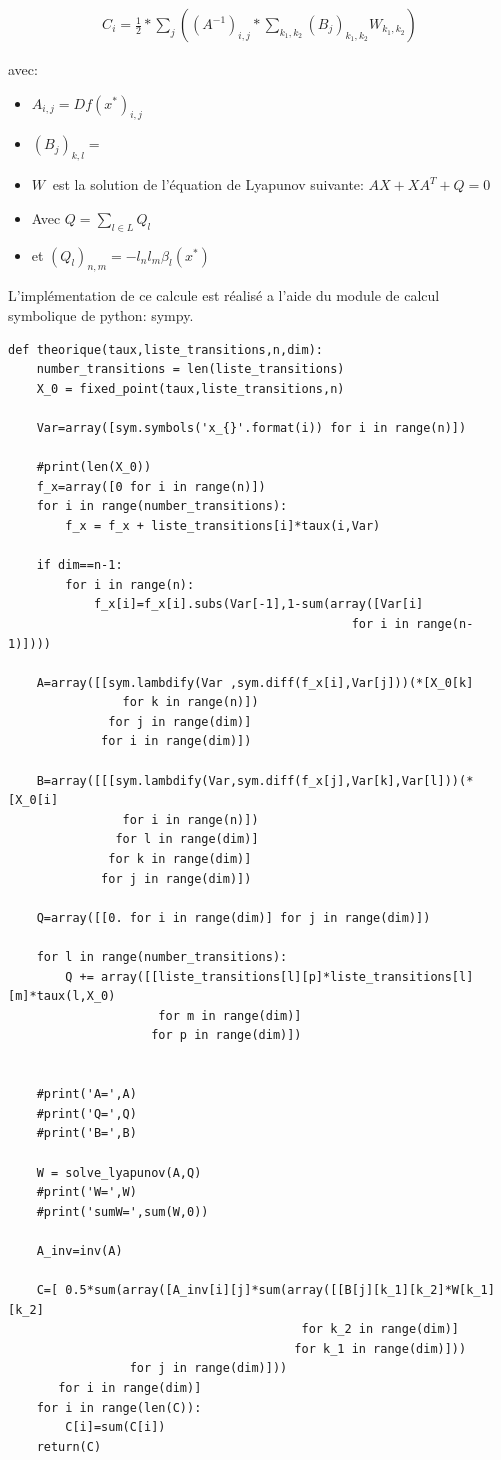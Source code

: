 \documentclass[a4paper]{article}
\begin{document}
\begin{eqnarray*}
  C_i=\frac{1}{2}*\sum_{j}((A^{-1})_{i,j}*\sum_{k_1,k_2}(B_j)_{k_1,k_2}W_{k_1,k_2})
\end{eqnarray*}

avec:
\begin{itemize}
\item $A_{i,j}=Df(x^*)_{i,j}$
\item $(B_j)_{k,l}=$
\item $W \ $ est la solution de l'équation de Lyapunov suivante: $AX+XA^T+Q=0$
\item Avec $Q=\sum_{l \in L} Q_l$
\item et $(Q_l)_{n,m}=-l_nl_m \beta_l(x^*)$
\end{itemize}

L'implémentation de ce calcule est réalisé a l'aide du module de
calcul symbolique de python: sympy.

\newpage
\begin{lstlisting}[frame=single]
  def theorique(taux,liste_transitions,n,dim):
    number_transitions = len(liste_transitions)  
    X_0 = fixed_point(taux,liste_transitions,n)
    
    Var=array([sym.symbols('x_{}'.format(i)) for i in range(n)])
    
    #print(len(X_0))
    f_x=array([0 for i in range(n)])
    for i in range(number_transitions):
        f_x = f_x + liste_transitions[i]*taux(i,Var)

    if dim==n-1:
        for i in range(n):
            f_x[i]=f_x[i].subs(Var[-1],1-sum(array([Var[i] 
                                                for i in range(n-1)])))

    A=array([[sym.lambdify(Var ,sym.diff(f_x[i],Var[j]))(*[X_0[k] 
                for k in range(n)]) 
              for j in range(dim)] 
             for i in range(dim)])

    B=array([[[sym.lambdify(Var,sym.diff(f_x[j],Var[k],Var[l]))(*[X_0[i] 
                for i in range(n)]) 
               for l in range(dim)] 
              for k in range(dim)] 
             for j in range(dim)])

    Q=array([[0. for i in range(dim)] for j in range(dim)])

    for l in range(number_transitions):
        Q += array([[liste_transitions[l][p]*liste_transitions[l][m]*taux(l,X_0) 
                     for m in range(dim)] 
                    for p in range(dim)])


    #print('A=',A)
    #print('Q=',Q)
    #print('B=',B)
    
    W = solve_lyapunov(A,Q)
    #print('W=',W)
    #print('sumW=',sum(W,0))

    A_inv=inv(A)
    
    C=[ 0.5*sum(array([A_inv[i][j]*sum(array([[B[j][k_1][k_2]*W[k_1][k_2] 
                                         for k_2 in range(dim)] 
                                        for k_1 in range(dim)])) 
                 for j in range(dim)])) 
       for i in range(dim)]
    for i in range(len(C)):
        C[i]=sum(C[i])
    return(C)
\end{lstlisting}
\end{document}
